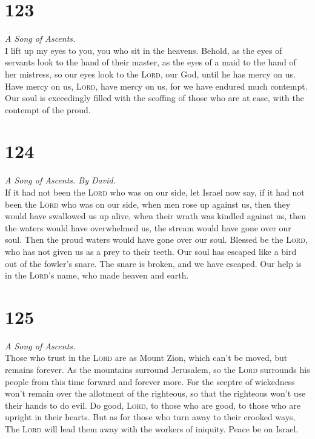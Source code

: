 \hypertarget{section-122}{%
\section{123}\label{section-122}}

\emph{A Song of Ascents.}\\
 I lift up my eyes to you, you who sit in the heavens.
 Behold, as the eyes of servants look to the hand of their
master, as the eyes of a maid to the hand of her mistress, so our eyes
look to the \textsc{Lord}, our God, until he has mercy on us.
 Have mercy on us, \textsc{Lord}, have mercy on us, for we
have endured much contempt.  Our soul is exceedingly
filled with the scoffing of those who are at ease, with the contempt of
the proud.

\hypertarget{section-123}{%
\section{124}\label{section-123}}

\emph{A Song of Ascents. By David.}\\
 If it had not been the \textsc{Lord} who was on our side,
let Israel now say,  if it had not been the \textsc{Lord}
who was on our side, when men rose up against us,  then
they would have swallowed us up alive, when their wrath was kindled
against us,  then the waters would have overwhelmed us,
the stream would have gone over our soul.  Then the proud
waters would have gone over our soul.  Blessed be the
\textsc{Lord}, who has not given us as a prey to their teeth.
 Our soul has escaped like a bird out of the fowler's
snare. The snare is broken, and we have escaped.  Our help
is in the \textsc{Lord}'s name, who made heaven and earth.

\hypertarget{section-124}{%
\section{125}\label{section-124}}

\emph{A Song of Ascents.}\\
 Those who trust in the \textsc{Lord} are as Mount Zion,
which can't be moved, but remains forever.  As the
mountains surround Jerusalem, so the \textsc{Lord} surrounds his people
from this time forward and forever more.  For the sceptre
of wickedness won't remain over the allotment of the righteous, so that
the righteous won't use their hands to do evil.  Do good,
\textsc{Lord}, to those who are good, to those who are upright in their
hearts.  But as for those who turn away to their crooked
ways, The \textsc{Lord} will lead them away with the workers of
iniquity. Peace be on Israel.

